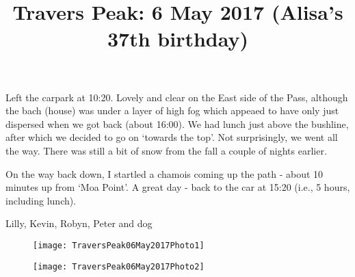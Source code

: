 \documentclass[12pt]{article} %
\title{Travers Peak: 6 May 2017 \footnotesize{(Alisa's 37th birthday)}}
\makeatletter
\renewcommand{\maketitle}{%
  {\bfseries{\scshape{\Large{\@title\par}}}}
}
\makeatother
\begin{document}
  \maketitle

Left the carpark at 10:20.  Lovely and clear on the East side of the Pass, although the bach (house) was under a layer of high fog which appeaed to have only just dispersed when we got back (about 16:00).  We had lunch just above the bushline, after which we decided to go on `towards the top'.  Not surprisingly, we went all the way.  There was still a bit of snow from the fall a couple of nights earlier.

On the way back down, I startled a chamois coming up the path - about 10 minutes up from `Moa Point'.  A great day - back to the car at 15:20 (i.e., 5 hours, including lunch).

\begin{flushright}
Lilly, Kevin, Robyn, Peter and dog
\end{flushright}

\begin{figure}[ht]
\begin{minipage}{.5\linewidth}
\begin{flushleft}
   \texttt{[image: TraversPeak06May2017Photo1]}
\end{flushleft}
\end{minipage}
\begin{minipage}{.5\linewidth}
\begin{flushright}
    \texttt{[image: TraversPeak06May2017Photo2]}
\end{flushright}
\end{minipage}
\end{figure}
\end{document}

